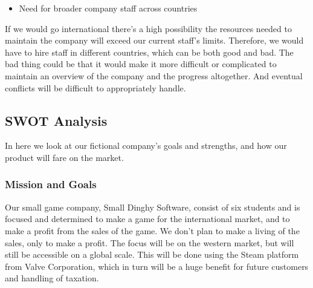 	\begin{itemize}
		\item Need for broader company staff across countries
	\end{itemize}
If we would go international there’s a high possibility the resources
   needed to maintain the company will exceed our current staff’s limits.
    Therefore, we would have to hire staff in different countries, which
    can be both good and bad. The bad thing could be that it would make
    it more difficult or complicated to maintain an overview of the company
     and the progress altogether. And eventual conflicts will be difficult
     to appropriately handle.
	\subsection{SWOT Analysis}
	In here we look at our fictional company’s goals and strengths, and how
   our product will fare on the market.
	\\
	\subsubsection{Mission and Goals}
	Our small game company, Small Dinghy Software, consist of six students
   and is focused and determined to make a game for the international market,
    and to make a profit from the sales of the game. We don’t plan to make a
     living of the sales, only to make a profit. The focus will be on the
     western market, but will still be accessible on a global scale. This
     will be done using the Steam platform from Valve Corporation, which
     in turn will be a huge benefit for future customers and handling of
     taxation.
	\\
